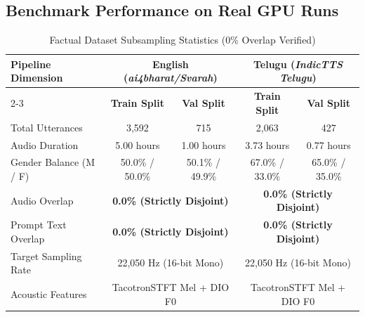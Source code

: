 \documentclass[11pt,a4paper]{article}
\newcommand{\toprule}{\hline\hline}
\newcommand{\midrule}{\hline}
\newcommand{\bottomrule}{\hline\hline}
\begin{document}
\subsection{Benchmark Performance on Real GPU Runs}

\begin{table}[h!]
\centering
\caption{Factual Dataset Subsampling Statistics (0\% Overlap Verified)}
\vspace{0.4em}
\begin{tabular}{lcccc}
\toprule
\textbf{Pipeline Dimension} & \multicolumn{2}{c}{\textbf{English (\textit{ai4bharat/Svarah})}} & \multicolumn{2}{c}{\textbf{Telugu (\textit{IndicTTS Telugu})}} \\
\cline{2-3} \cline{4-5}
 & \textbf{Train Split} & \textbf{Val Split} & \textbf{Train Split} & \textbf{Val Split} \\
\midrule
Total Utterances & 3,592 & 715 & 2,063 & 427 \\
Audio Duration & 5.00 hours & 1.00 hours & 3.73 hours & 0.77 hours \\
Gender Balance (M / F) & 50.0\% / 50.0\% & 50.1\% / 49.9\% & 67.0\% / 33.0\% & 65.0\% / 35.0\% \\
Audio Overlap & \multicolumn{2}{c}{\textbf{0.0\% (Strictly Disjoint)}} & \multicolumn{2}{c}{\textbf{0.0\% (Strictly Disjoint)}} \\
Prompt Text Overlap & \multicolumn{2}{c}{\textbf{0.0\% (Strictly Disjoint)}} & \multicolumn{2}{c}{\textbf{0.0\% (Strictly Disjoint)}} \\
Target Sampling Rate & \multicolumn{2}{c}{22,050 Hz (16-bit Mono)} & \multicolumn{2}{c}{22,050 Hz (16-bit Mono)} \\
Acoustic Features & \multicolumn{2}{c}{TacotronSTFT Mel + DIO F0} & \multicolumn{2}{c}{TacotronSTFT Mel + DIO F0} \\
\bottomrule
\end{tabular}
\end{table}
\end{document}
